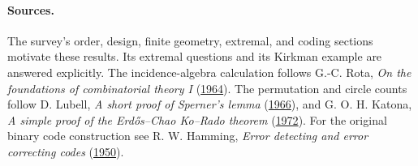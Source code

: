 \paragraph{Sources.}
The survey's order, design, finite geometry, extremal, and coding sections
motivate these results. Its extremal questions and its Kirkman example
are answered explicitly. The incidence-algebra calculation follows
G.-C. Rota, \emph{On the foundations of combinatorial theory I}
(\href{https://doi.org/10.1007/BF00531932}{1964}).
The permutation and circle counts follow D. Lubell,
\emph{A short proof of Sperner's lemma}
(\href{https://doi.org/10.1016/S0021-9800(66)80035-2}{1966}),
and G. O. H. Katona, \emph{A simple proof of the Erd\H{o}s--Chao
Ko--Rado theorem}
(\href{https://doi.org/10.1016/0095-8956(72)90054-8}{1972}).
For the original binary code construction see R. W. Hamming,
\emph{Error detecting and error correcting codes}
(\href{https://doi.org/10.1002/j.1538-7305.1950.tb00463.x}{1950}).
